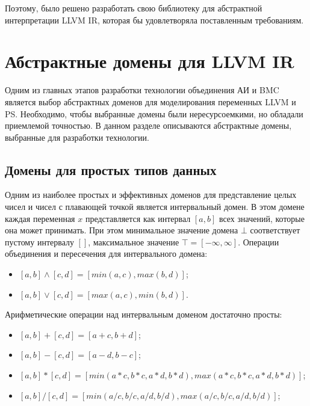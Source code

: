 Поэтому, было решено разработать свою библиотеку для абстрактной интерпретации
LLVM IR, которая бы удовлетворяла поставленным требованиям.

\section{Абстрактные домены для LLVM IR}
\label{section:domains}
Одним из главных этапов разработки технологии объединения АИ и BMC является
выбор абстрактных доменов для моделирования переменных LLVM и PS. Необходимо,
чтобы выбранные домены были нересурсоемкими, но обладали приемлемой точностью.
В данном разделе описываются абстрактные домены, выбранные для разработки 
технологии.

\subsection{Домены для простых типов данных}
Одним из наиболее простых и эффективных доменов для представление целых чисел и
чисел с плавающей точкой является интервальный домен. В этом домене каждая 
переменная $x$ представляется как интервал $[a, b]$ всех значений, которые она 
может принимать. При этом минимальное значение домена $\bot$ соответствует 
пустому интервалу $[]$, максимальное значение $\top = [-\infty, \infty]$. 
Операции объединения и пересечения для интервального домена:
\begin{itemize}
\item $[a, b] \wedge [c, d] = [min(a, c), max(b, d)]$;
\item $[a, b] \vee [c, d] = [max(a, c), min(b, d)]$.
\end{itemize}

Арифметические операции над интервальным доменом достаточно просты:
\begin{itemize}
\item $[a, b] + [c, d] = [a + c, b + d]$;
\item $[a, b] - [c, d] = [a - d, b - c]$;
\item $[a, b] * [c, d] = [min(a * c, b * c, a * d, b * d), max(a * c, b * c,
a * d, b * d)]$;
\item $[a, b] / [c, d] = [min(a / c, b / c, a / d, b / d), max(a / c, b / c,
a / d, b / d)]$;
\end{itemize}


